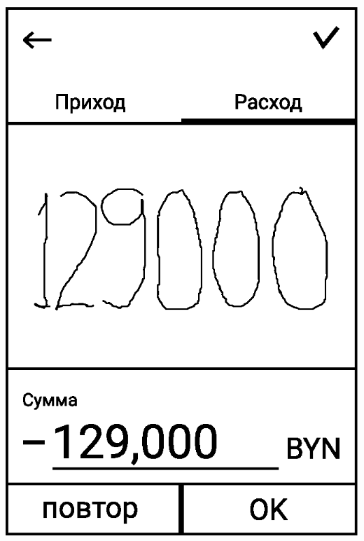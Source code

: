 \documentclass[russian,utf8,a1paper,nostitching,simple]{eskdgraph}
\begin{document}
\begin{ESKDdrawing}
\begin{minipage}{17cm}
\begin{minipage}{7.5cm}
      \vspace{2cm}
      \centering
      \includegraphics[width=\linewidth]{fig/ui_activities_input_outcome_graphic.eps}
    \end{minipage}
    \hfill
    \begin{minipage}{7.5cm}
      \centering


\end{minipage}
\end{minipage}
\end{ESKDdrawing}
\end{document}
